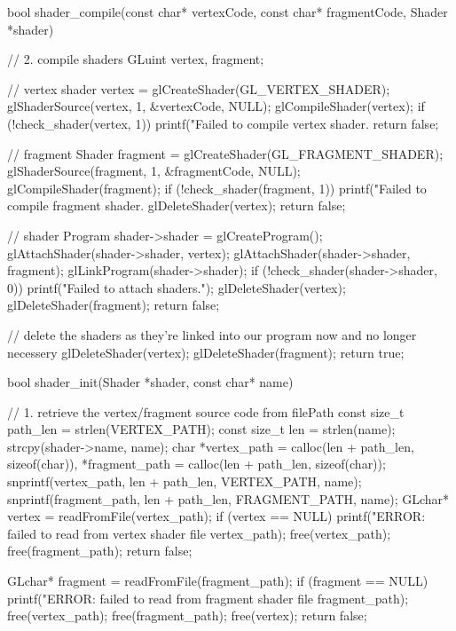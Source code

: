 \begin{multicols}{2}
\begin{ccode}
bool shader_compile(const char* vertexCode, const char* fragmentCode,
                    Shader *shader) {
    // 2. compile shaders
    GLuint vertex, fragment;

    // vertex shader
    vertex = glCreateShader(GL_VERTEX_SHADER);
    glShaderSource(vertex, 1, &vertexCode, NULL);
    glCompileShader(vertex);
    if (!check_shader(vertex, 1)) {
        printf("Failed to compile vertex shader.\n%
        return false;
    }

    // fragment Shader
    fragment = glCreateShader(GL_FRAGMENT_SHADER);
    glShaderSource(fragment, 1, &fragmentCode, NULL);
    glCompileShader(fragment);
    if (!check_shader(fragment, 1)) {
        printf("Failed to compile fragment shader.\n%
        glDeleteShader(vertex);
        return false;
    }

    // shader Program
    shader->shader = glCreateProgram();
    glAttachShader(shader->shader, vertex);
    glAttachShader(shader->shader, fragment);
    glLinkProgram(shader->shader);
    if (!check_shader(shader->shader, 0)) {
        printf("Failed to attach shaders.");
        glDeleteShader(vertex);
        glDeleteShader(fragment);
        return false;
    }

    // delete the shaders as they're linked into our program now and no longer necessery
    glDeleteShader(vertex);
    glDeleteShader(fragment);
    return true;
}

bool shader_init(Shader *shader, const char* name) {
    // 1. retrieve the vertex/fragment source code from filePath
    const size_t path_len = strlen(VERTEX_PATH);
    const size_t len = strlen(name);
    strcpy(shader->name, name);
    char *vertex_path = calloc(len + path_len, sizeof(char)),
        *fragment_path = calloc(len + path_len, sizeof(char));
    snprintf(vertex_path, len + path_len, VERTEX_PATH, name);
    snprintf(fragment_path, len + path_len, FRAGMENT_PATH, name);
    GLchar* vertex = readFromFile(vertex_path);
    if (vertex == NULL) {
        printf("ERROR: failed to read from vertex shader file %
               vertex_path);
        free(vertex_path);
        free(fragment_path);
        return false;
    }

    GLchar* fragment = readFromFile(fragment_path);
    if (fragment == NULL) {
        printf("ERROR: failed to read from fragment shader file %
               fragment_path);
        free(vertex_path);
        free(fragment_path);
        free(vertex);
        return false;
    }

}
\end{ccode}
\end{multicols}
